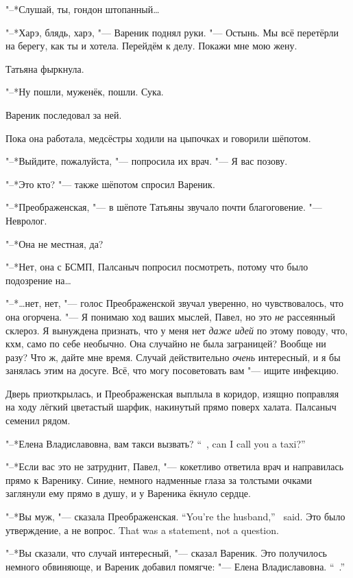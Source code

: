 "--*Слушай, ты, гондон штопанный\ldots{}

"--*Харэ, блядь, харэ, "--- Вареник поднял руки.
"--- Остынь.
Мы всё перетёрли на берегу, как ты и хотела.
Перейдём к делу.
Покажи мне мою жену.

Татьяна фыркнула.

"--*Ну пошли, муженёк, пошли.
Сука.

Вареник последовал за ней.

\asterism

\textspace

Пока она работала, медсёстры ходили на цыпочках и говорили шёпотом.

"--*Выйдите, пожалуйста, "--- попросила их врач.
"--- Я вас позову.

"--*Это кто? "--- также шёпотом спросил Вареник.

"--*Преображенская, "--- в шёпоте Татьяны звучало почти благоговение.
"--- Невролог.

"--*Она не местная, да?

"--*Нет, она с БСМП, Палсаныч попросил посмотреть, потому что было подозрение на\ldots{}

"--*\ldots{}нет, нет, "--- голос Преображенской звучал уверенно, но чувствовалось, что она огорчена.
"--- Я понимаю ход ваших мыслей, Павел, но это \emph{не} рассеянный склероз.
Я вынуждена признать, что у меня нет \emph{даже идей} по этому поводу, что, кхм, само по себе необычно.
Она случайно не была заграницей?
Вообще ни разу?
Что ж, дайте мне время.
Случай действительно \emph{очень} интересный, и я бы занялась этим на досуге.
Всё, что могу посоветовать вам "--- ищите инфекцию.

Дверь приоткрылась, и Преображенская выплыла в коридор, изящно поправляя на ходу лёгкий цветастый шарфик, накинутый прямо поверх халата.
Палсаныч семенил рядом.

{"--*Елена Владиславовна, вам такси вызвать?}
{``\Yelena\ \Vladislavovna, can I call you a taxi?''}

"--*Если вас это не затруднит, Павел, "--- кокетливо ответила врач и направилась прямо к Варенику.
Синие, немного надменные глаза за толстыми очками заглянули ему прямо в душу, и у Вареника ёкнуло сердце.

{"--*Вы муж, "--- сказала Преображенская.}
{``You're the husband,'' \Preobrazhenskaya\ said.}
{Это было утверждение, а не вопрос.}
{That was a statement, not a question.}

"--*Вы сказали, что случай интересный, "--- сказал Вареник.
Это получилось немного обвиняюще, и Вареник добавил помягче:
{"--- Елена Владиславовна.}
{``\Yelena\ \Vladislavovna.''}


